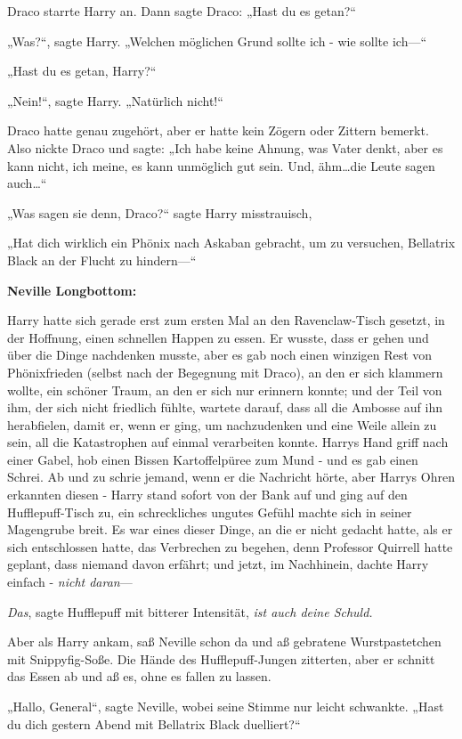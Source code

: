 {Draco starrte Harry an. Dann sagte Draco: „Hast du es getan?“

„Was?“, sagte Harry. „Welchen möglichen Grund sollte ich - wie sollte ich—“

„Hast du es getan, Harry?“

„Nein!“, sagte Harry. „Natürlich nicht!“

Draco hatte genau zugehört, aber er hatte kein Zögern oder Zittern bemerkt. Also nickte Draco und sagte: „Ich habe keine Ahnung, was Vater denkt, aber es kann nicht, ich meine, es kann unmöglich gut sein. Und, ähm…die Leute sagen auch…“

„Was sagen sie denn, Draco?“ sagte Harry misstrauisch,

„Hat dich wirklich ein Phönix nach Askaban gebracht, um zu versuchen, Bellatrix Black an der Flucht zu hindern—“

\textbf{Neville Longbottom:}

Harry hatte sich gerade erst zum ersten Mal an den Ravenclaw-Tisch gesetzt, in der Hoffnung, einen schnellen Happen zu essen. Er wusste, dass er gehen und über die Dinge nachdenken musste, aber es gab noch einen winzigen Rest von Phönixfrieden (selbst nach der Begegnung mit Draco), an den er sich klammern wollte, ein schöner Traum, an den er sich nur erinnern konnte; und der Teil von ihm, der sich nicht friedlich fühlte, wartete darauf, dass all die Ambosse auf ihn herabfielen, damit er, wenn er ging, um nachzudenken und eine Weile allein zu sein, all die Katastrophen auf einmal verarbeiten konnte. Harrys Hand griff nach einer Gabel, hob einen Bissen Kartoffelpüree zum Mund - und es gab einen Schrei. Ab und zu schrie jemand, wenn er die Nachricht hörte, aber Harrys Ohren erkannten diesen - Harry stand sofort von der Bank auf und ging auf den Hufflepuff-Tisch zu, ein schreckliches ungutes Gefühl machte sich in seiner Magengrube breit. Es war eines dieser Dinge, an die er nicht gedacht hatte, als er sich entschlossen hatte, das Verbrechen zu begehen, denn Professor Quirrell hatte geplant, dass niemand davon erfährt; und jetzt, im Nachhinein, dachte Harry einfach - \emph{nicht daran}—

\emph{Das}, sagte Hufflepuff mit bitterer Intensität, \emph{ist auch deine Schuld.}

Aber als Harry ankam, saß Neville schon da und aß gebratene Wurstpastetchen mit Snippyfig-Soße. Die Hände des Hufflepuff-Jungen zitterten, aber er schnitt das Essen ab und aß es, ohne es fallen zu lassen.

„Hallo, General“, sagte Neville, wobei seine Stimme nur leicht schwankte. „Hast du dich gestern Abend mit Bellatrix Black duelliert?“

}
